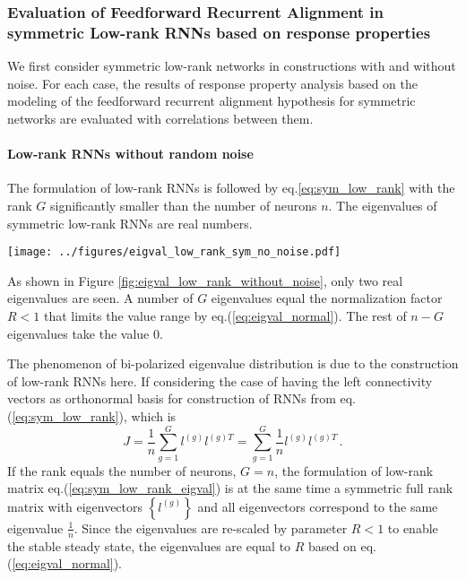 \documentclass[11pt]{article}
\begin{document}
	\subsubsection{Evaluation of Feedforward Recurrent Alignment in symmetric Low-rank RNNs based on response properties}
	We first consider symmetric low-rank networks in constructions with and without noise. For each case, the results of response property analysis based on the modeling of the feedforward recurrent alignment hypothesis for symmetric networks are evaluated with correlations between them. 
	
	\paragraph{Low-rank RNNs without random noise}
	The formulation of low-rank RNNs is followed by eq.\ref{eq:sym_low_rank} with the rank $G$ significantly smaller than the number of neurons $n$. The eigenvalues of symmetric low-rank RNNs are real numbers. 
		\begin{SCfigure}[1.5][h] 
			\centering 
			\caption[Eigenvalue distribution of symmetric low-rank RNNs without random noise]{\textbf{Eigenvalue distribution of symmetric low-rank RNNs without random noise.} The eigenvalues of symmetric low-rank RNNs are real numbers (x-axis). With rank $G = 1 \ll n = 200$ the number of neurons, $1$ eigenvalue takes the value of normalization factor $R = 0.85$, and the rest $n-G = 199$ eigenvalues equal $0$. }
			\texttt{[image: ../figures/eigval\_low\_rank\_sym\_no\_noise.pdf]}
			\label{fig:eigval_low_rank_without_noise}
		\end{SCfigure}
	
	As shown in Figure \ref{fig:eigval_low_rank_without_noise}, only two real eigenvalues are seen. A number of $G$ eigenvalues equal the normalization factor $R < 1$ that limits the value range by eq.(\ref{eq:eigval_normal}). The rest of $n-G$ eigenvalues take the value $0$. 
	
	The phenomenon of bi-polarized eigenvalue distribution is due to the construction of low-rank RNNs here. If considering the case of having the left connectivity vectors as orthonormal basis for construction of RNNs from eq.(\ref{eq:sym_low_rank}), which is
		\begin{equation} \label{eq:sym_low_rank_eigval}
			J = \frac{1}{n}\sum_{g =1}^{G} l^{(g)} l^{(g)T} = \sum_{g =1}^{G} \frac{1}{n} l^{(g)} l^{(g)T}\, . 
		\end{equation}
	If the rank equals the number of neurons, $G = n$, the formulation of low-rank matrix eq.(\ref{eq:sym_low_rank_eigval}) is at the same time a symmetric full rank matrix with eigenvectors $\left\{l^{(g)}\right\}$ and all eigenvectors correspond to the same eigenvalue $\frac{1}{n}$. Since the eigenvalues are re-scaled by parameter $R < 1$ to enable the stable steady state, the eigenvalues are equal to $R$ based on eq.(\ref{eq:eigval_normal}). 
	
\end{document}
